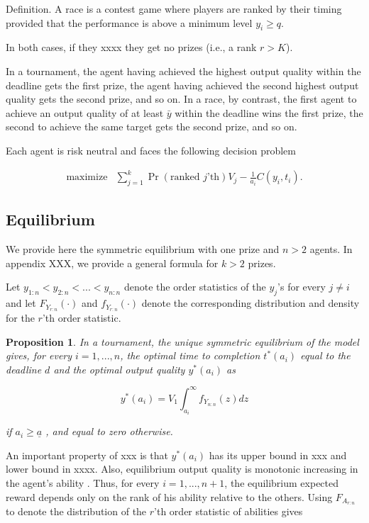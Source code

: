 \documentclass[12pt,]{article}
\newtheorem{proposition}{Proposition}
\begin{document}
Definition. A race is a contest game where players are ranked by their
timing provided that the performance is above a minimum level
\(y_i\geq q\).

In both cases, if they xxxx they get no prizes (i.e., a rank \(r > K\)).

In a tournament, the agent having achieved the highest output quality
within the deadline gets the first prize, the agent having achieved the
second highest output quality gets the second prize, and so on. In a
race, by contrast, the first agent to achieve an output quality of at
least \({\bar y}\) within the deadline wins the first prize, the second
to achieve the same target gets the second prize, and so on.

Each agent is risk neutral and faces the following decision problem

\[\begin{array}{ll}
    \mbox{maximize} & \sum_{j=1}^k \Pr(\text{ranked $j$'th}) V_j  - \frac{1}{a_i} C(y_i, t_i).
  \end{array}\]

\subsection{Equilibrium}\label{equilibrium}

We provide here the symmetric equilibrium with one prize and \(n>2\)
agents. In appendix XXX, we provide a general formula for \(k>2\)
prizes.

Let \(y_{1:n} < y_{2:n} < ... < y_{n:n}\) denote the order statistics of
the \(y_j\)'s for every \(j\neq i\) and let \({F_{Y_{r:n}}}(\cdot)\) and
\({f_{Y_{r:n}}}(\cdot)\) denote the corresponding distribution and
density for the \(r\)'th order statistic.

\begin{proposition}

In a tournament, the unique symmetric equilibrium of the model gives,
for every \(i=1, ..., n\), the optimal time to completion \(t^*(a_i)\)
equal to the deadline \(d\) and the optimal output quality \(y^*(a_i)\)
as

\[\label{eq: optimal bid tournament}
  y^*(a_i) =  V_1 \int_{a_i}^\infty {f_{Y_{n:n}}} (z) dz\]

if \({a_i}\geq {\underline a}\) \citep[see][]{moldovanu2001optimal}, and
equal to zero otherwise.

\end{proposition}

An important property of xxx is that \(y^*(a_i)\) has its upper bound in
xxx and lower bound in xxxx. Also, equilibrium output quality is
monotonic increasing in the agent's ability
\citep[see][]{moldovanu2001optimal}. Thus, for every \(i=1, ..., n+1\),
the equilibrium expected reward depends only on the rank of his ability
relative to the others. Using \({F_{A_{r:n}}}\) to denote the
distribution of the \(r\)'th order statistic of abilities gives
\end{document}
